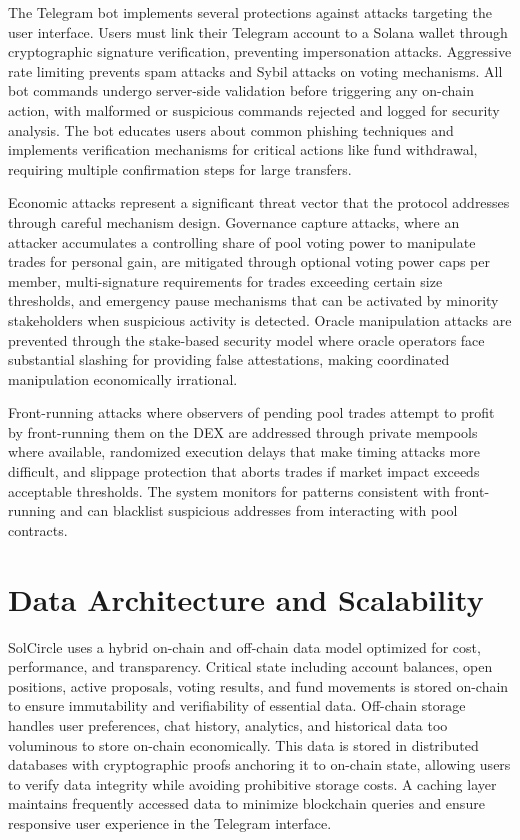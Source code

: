 \documentclass[11pt,a4paper]{article}
\begin{document}
The Telegram bot implements several protections against attacks targeting the user interface. Users must link their Telegram account to a Solana wallet through cryptographic signature verification, preventing impersonation attacks. Aggressive rate limiting prevents spam attacks and Sybil attacks on voting mechanisms. All bot commands undergo server-side validation before triggering any on-chain action, with malformed or suspicious commands rejected and logged for security analysis. The bot educates users about common phishing techniques and implements verification mechanisms for critical actions like fund withdrawal, requiring multiple confirmation steps for large transfers.

Economic attacks represent a significant threat vector that the protocol addresses through careful mechanism design. Governance capture attacks, where an attacker accumulates a controlling share of pool voting power to manipulate trades for personal gain, are mitigated through optional voting power caps per member, multi-signature requirements for trades exceeding certain size thresholds, and emergency pause mechanisms that can be activated by minority stakeholders when suspicious activity is detected. Oracle manipulation attacks are prevented through the stake-based security model where oracle operators face substantial slashing for providing false attestations, making coordinated manipulation economically irrational.

Front-running attacks where observers of pending pool trades attempt to profit by front-running them on the DEX are addressed through private mempools where available, randomized execution delays that make timing attacks more difficult, and slippage protection that aborts trades if market impact exceeds acceptable thresholds. The system monitors for patterns consistent with front-running and can blacklist suspicious addresses from interacting with pool contracts.

\section{Data Architecture and Scalability}

SolCircle uses a hybrid on-chain and off-chain data model optimized for cost, performance, and transparency. Critical state including account balances, open positions, active proposals, voting results, and fund movements is stored on-chain to ensure immutability and verifiability of essential data. Off-chain storage handles user preferences, chat history, analytics, and historical data too voluminous to store on-chain economically. This data is stored in distributed databases with cryptographic proofs anchoring it to on-chain state, allowing users to verify data integrity while avoiding prohibitive storage costs. A caching layer maintains frequently accessed data to minimize blockchain queries and ensure responsive user experience in the Telegram interface.
\end{document}
